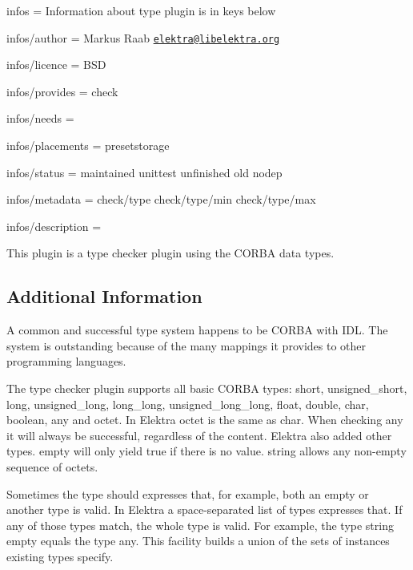 
\begin{DoxyItemize}
\item infos = Information about type plugin is in keys below
\item infos/author = Markus Raab \href{mailto:elektra@libelektra.org}{\tt elektra@libelektra.\+org}
\item infos/licence = B\+S\+D
\item infos/provides = check
\item infos/needs =
\item infos/placements = presetstorage
\item infos/status = maintained unittest unfinished old nodep
\item infos/metadata = check/type check/type/min check/type/max
\item infos/description =
\end{DoxyItemize}

This plugin is a type checker plugin using the {\ttfamily C\+O\+R\+B\+A} data types.

\subsection*{Additional Information}

A common and successful type system happens to be C\+O\+R\+B\+A with I\+D\+L. The system is outstanding because of the many mappings it provides to other programming languages.

The type checker plugin supports all basic C\+O\+R\+B\+A types\+: {\ttfamily short}, {\ttfamily unsigned\+\_\+short}, {\ttfamily long}, {\ttfamily unsigned\+\_\+long}, {\ttfamily long\+\_\+long}, {\ttfamily unsigned\+\_\+long\+\_\+long}, {\ttfamily float}, {\ttfamily double}, {\ttfamily char}, {\ttfamily boolean}, {\ttfamily any} and {\ttfamily octet}. In Elektra {\ttfamily octet} is the same as {\ttfamily char}. When checking any it will always be successful, regardless of the content. Elektra also added other types. {\ttfamily empty} will only yield true if there is no value. {\ttfamily string} allows any non-\/empty sequence of octets.

Sometimes the type should expresses that, for example, both an empty or another type is valid. In Elektra a space-\/separated list of types expresses that. If any of those types match, the whole type is valid. For example, the type {\ttfamily string empty} equals the type {\ttfamily any}. This facility builds a union of the sets of instances existing types specify.

